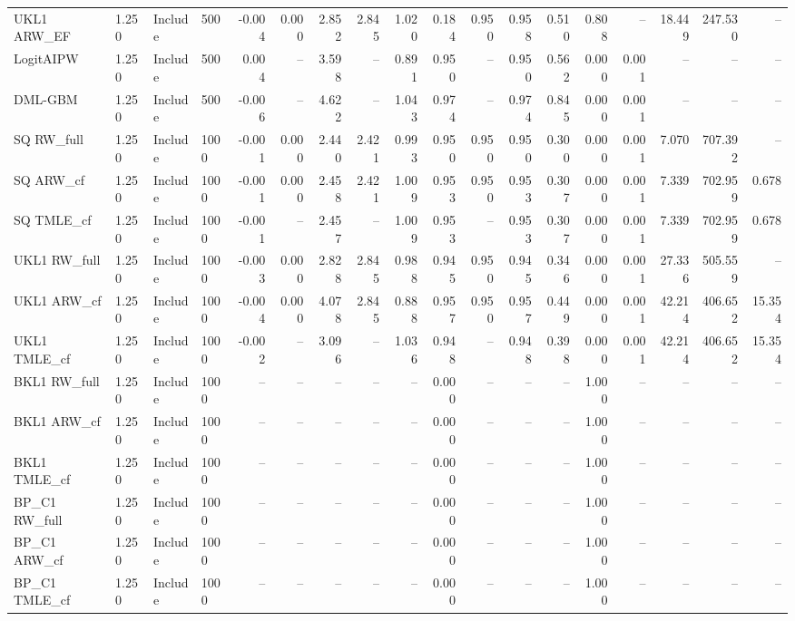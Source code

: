 \begin{tabular}{llllrrrrrrrrrrrrrr}
UKL1 ARW\_EF & 1.250 & Include & 500 & -0.004 & 0.000 & 2.852 & 2.845 & 1.020 & 0.184 & 0.950 & 0.958 & 0.510 & 0.808 & -- & 18.449 & 247.530 & -- \\
LogitAIPW & 1.250 & Include & 500 & 0.004 & -- & 3.598 & -- & 0.891 & 0.950 & -- & 0.950 & 0.562 & 0.000 & 0.001 & -- & -- & -- \\
DML-GBM & 1.250 & Include & 500 & -0.006 & -- & 4.622 & -- & 1.043 & 0.974 & -- & 0.974 & 0.845 & 0.000 & 0.001 & -- & -- & -- \\
SQ RW\_full & 1.250 & Include & 1000 & -0.001 & 0.000 & 2.440 & 2.421 & 0.993 & 0.950 & 0.950 & 0.950 & 0.300 & 0.000 & 0.001 & 7.070 & 707.392 & -- \\
SQ ARW\_cf & 1.250 & Include & 1000 & -0.001 & 0.000 & 2.458 & 2.421 & 1.009 & 0.953 & 0.950 & 0.953 & 0.307 & 0.000 & 0.001 & 7.339 & 702.959 & 0.678 \\
SQ TMLE\_cf & 1.250 & Include & 1000 & -0.001 & -- & 2.457 & -- & 1.009 & 0.953 & -- & 0.953 & 0.307 & 0.000 & 0.001 & 7.339 & 702.959 & 0.678 \\
UKL1 RW\_full & 1.250 & Include & 1000 & -0.003 & 0.000 & 2.828 & 2.845 & 0.988 & 0.945 & 0.950 & 0.945 & 0.346 & 0.000 & 0.001 & 27.336 & 505.559 & -- \\
UKL1 ARW\_cf & 1.250 & Include & 1000 & -0.004 & 0.000 & 4.078 & 2.845 & 0.888 & 0.957 & 0.950 & 0.957 & 0.449 & 0.000 & 0.001 & 42.214 & 406.652 & 15.354 \\
UKL1 TMLE\_cf & 1.250 & Include & 1000 & -0.002 & -- & 3.096 & -- & 1.036 & 0.948 & -- & 0.948 & 0.398 & 0.000 & 0.001 & 42.214 & 406.652 & 15.354 \\
BKL1 RW\_full & 1.250 & Include & 1000 & -- & -- & -- & -- & -- & 0.000 & -- & -- & -- & 1.000 & -- & -- & -- & -- \\
BKL1 ARW\_cf & 1.250 & Include & 1000 & -- & -- & -- & -- & -- & 0.000 & -- & -- & -- & 1.000 & -- & -- & -- & -- \\
BKL1 TMLE\_cf & 1.250 & Include & 1000 & -- & -- & -- & -- & -- & 0.000 & -- & -- & -- & 1.000 & -- & -- & -- & -- \\
BP\_C1 RW\_full & 1.250 & Include & 1000 & -- & -- & -- & -- & -- & 0.000 & -- & -- & -- & 1.000 & -- & -- & -- & -- \\
BP\_C1 ARW\_cf & 1.250 & Include & 1000 & -- & -- & -- & -- & -- & 0.000 & -- & -- & -- & 1.000 & -- & -- & -- & -- \\
BP\_C1 TMLE\_cf & 1.250 & Include & 1000 & -- & -- & -- & -- & -- & 0.000 & -- & -- & -- & 1.000 & -- & -- & -- & -- \\

\end{tabular}
